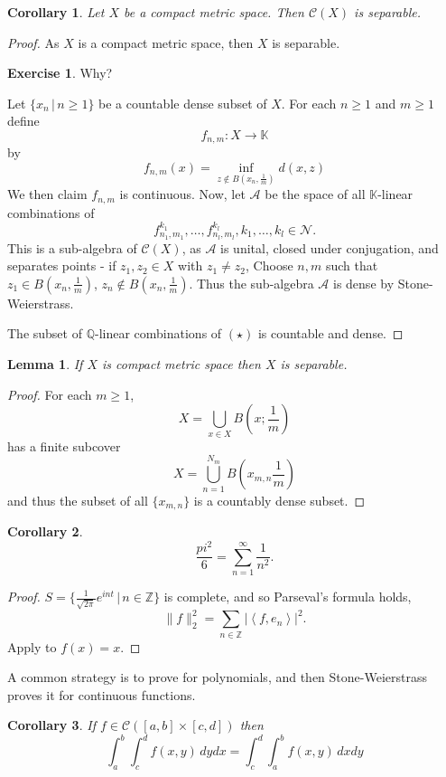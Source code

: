\documentclass[10pt, reqno, oneside]{amsart}
\theoremstyle{plain}%
\newtheorem{lem}[thm]{Lemma}
\newtheorem*{cor}{Corollary}
\theoremstyle{definition}
\newtheorem{exer}[thm]{Exercise}
\theoremstyle{remark}
\newcommand{\given}{ \, | \,}
\newcommand{\Q}{\mathbb{Q}}
\newcommand{\K}{\mathbb{K}}
\newcommand{\Z}{\mathbb{Z}}
\newcommand{\iprod}[1]{\left\langle #1 \right\rangle}
\begin{document}
\begin{cor}
	Let $X$ be a compact metric space.  Then $\mathcal C(X)$ is separable.
\end{cor}
\begin{proof}
	As $X$ is a compact metric space, then $X$ is separable.  
	\begin{exer}
		Why?
	\end{exer}
	Let $\{ x_n \given n \geq 1 \}$ be a countable dense subset of $X$.  For each $n \geq 1$ and $m \geq 1$ define \[
		f_{n,m} : X \rightarrow \K
	\] by \[f_{n,m}(x) = \inf_{z \notin B(x_n, \frac{1}{m})} d(x,z)\]
	We then claim $f_{n,m}$ is continuous.  Now, let $\mathcal{A}$ be the space of all $\K$-linear combinations of \begin{equation*}
		f^{k_1}_{n_1,m_1}, \dots, f_{n_l, m_l}^{k_l}, k_1, \dots, k_l \in \mathcal{N}. \tag{$\star$}
	\end{equation*}
 This is a sub-algebra of $\mathcal C(X)$, as $\mathcal A$ is unital, closed under conjugation, and separates points - if $z_1, z_2 \in X$ with $z_1 \neq z_2$, Choose $n,m$ such that $z_1 \in B(x_n, \frac{1}{m})$, $z_n \notin B(x_n, \frac{1}{m})$.  Thus the sub-algebra $\mathcal A$ is dense by Stone-Weierstrass.  
	
	The subset of $\Q$-linear combinations of $(\star)$ is countable and dense.
\end{proof}

\begin{lem}
	If $X$ is compact metric space then $X$ is separable.  
\end{lem}
\begin{proof}
	For each $m \geq 1$, \[
		X = \bigcup_{x \in X} B(x ; \frac{1}{m})
	\]  has a finite subcover \[
		X = \bigcup_{n=1}^{N_m} B(x_{m,n} \frac{1}{m})
	\] and thus the subset of all $\{x_{m,n} \}$ is a countably dense subset. 
\end{proof}

\begin{cor}
	\[
	\frac{pi^2}{6} = \sum_{n = 1}^\infty \frac{1}{n^2}.
	\] 
\end{cor}

\begin{proof}
	$S = \{ \frac{1}{\sqrt{2 \pi}} e^{i nt } \given n \in \Z \}$ is complete, and so Parseval's formula holds, \[
		\| f \|_2^2 = \sum_{ n \in \Z} | \iprod{f, e_n} |^2.
	\]  Apply to $f(x) = x$.  
\end{proof}

A common strategy is to prove for polynomials, and then Stone-Weierstrass proves it for continuous functions.  
\begin{cor}
	If $ f \in \mathcal C([a,b] \times [c,d])$ then \[
		\int_a^b \int_c^d f(x,y) \, dy dx = \int_c^d \int_a^b f(x,y) \, dx dy
	\]
\end{cor}
\end{document}
